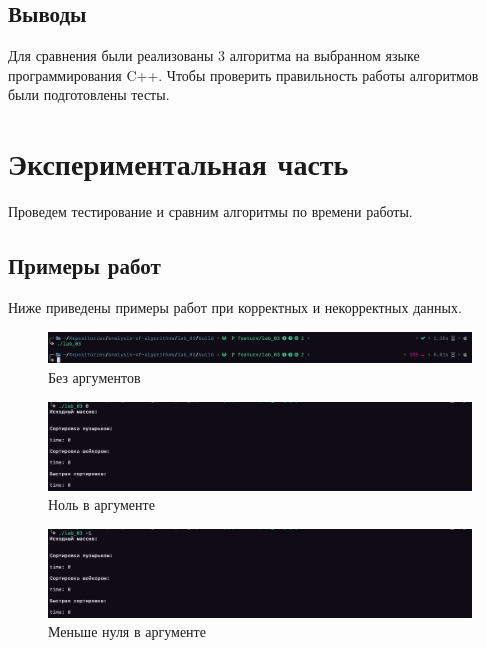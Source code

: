 \documentclass[a4paper,12pt]{article}
\begin{document}
\subsection{Выводы}

Для сравнения были реализованы 3 алгоритма на выбранном языке
программирования C++. Чтобы проверить правильность работы алгоритмов
были подготовлены тесты.

\newpage
\section{Экспериментальная часть}

Проведем тестирование и сравним алгоритмы по времени работы.

\subsection{Примеры работ}

Ниже приведены примеры работ при корректных и некорректных данных.

\begin{figure}[H]
    \centering
    \includegraphics[scale=0.4]{zero_arg}
    \caption{Без аргументов}
    \label{img:zero-arg}
\end{figure}

\begin{figure}[H]
    \centering
    \includegraphics[scale=0.4]{zero}
    \caption{Ноль в аргументе}
    \label{img:zero}
\end{figure}

\begin{figure}[H]
    \centering
    \includegraphics[scale=0.4]{less_zero}
    \caption{Меньше нуля в аргументе}
    \label{img:less-zero}
\end{figure}
\end{document}
